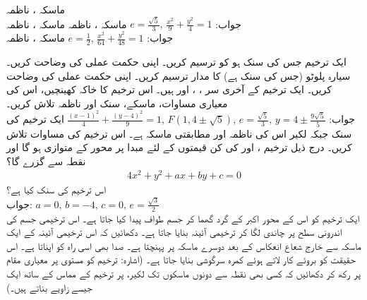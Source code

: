 ماسکہ ، ناظمہ \\
جواب:\quad
$e=\tfrac{\sqrt{5}}{3},\, \tfrac{x^2}{9}+\tfrac{y^2}{4}=1$
ماسکہ ، ناظمہ 
ماسکہ ، ناظمہ \\
جواب:\quad
$e=\tfrac{1}{2},\, \tfrac{x^2}{64}+\tfrac{y^2}{48}=1$
ماسکہ ، ناظمہ 

ایک ترخیم جس کی سنک  ہو کو ترسیم کریں۔ اپنی حکمت عملی کی وضاحت  کریں۔
سیارہ پلوٹو (جس کی سنک  ہے) کا مدار ترسیم کریں۔  اپنی حکمت عملی کی وضاحت  کریں۔
ایک ترخیم کے آخری سر ، ،  اور  ہیں۔ اس ترخیم کا خاکہ کھینچیں، اس کی معیاری مساوات، ماسکے، سنک اور ناظمہ تلاش کریں۔\\
جواب:\quad
$\tfrac{(x-1)^2}{4}+\tfrac{(y-4)^2}{9}=1,\, F(1,4\pm\sqrt{5}),\,e=\tfrac{\sqrt{5}}{3},\, y=4\pm\tfrac{9\sqrt{5}}{5}$
ایک ترخیم کی سنک   جبکہ لکیر  اس کی ناظمہ اور  مطابقتی ماسکہ ہے۔ اس ترخیم کی مساوات تلاش کریں۔
درج ذیل ترخیم ،  اور  کی کن قیمتوں کے لئے مبدا پر  محور کے متوازی ہو گا اور نقطہ  سے گزرے گا؟
\begin{align*}
4x^2+y^2+ax+by+c=0
\end{align*}
اس ترخیم کی سنک  کیا ہے؟\\
جواب:\quad
$a=0,\, b=-4,\, c=0,\, e=\tfrac{\sqrt{3}}{2}$
\\
 ایک ترخیم کو اس کے محور اکبر کے گرد گھما کر جسم طواف پیدا کیا جاتا ہے۔ اس ترخیمی جسم کی اندرونی سطح پر چاندی لگا کر ترخیمی آئینہ بنایا جاتا ہے۔ دکھائیں کہ اس ترخیمی آئینہ کے ایک ماسکہ سے خارج شعاع انعکاس کے بعد دوسرے ماسکہ پر پہنچتا ہے۔ صدا بھی اسی راہ کو اپناتا ہے۔ اس حقیقت کو بروئے کار لاتے ہوئے کمرہ سرگوشی بنایا جاتا ہے۔ (اشارہ: ترخیم کو  مستوی پر معیاری مقام پر رکھ کر دکھائیں کہ کسی بھی نقطہ  سے دونوں ماسکوں تک لکیر،  پر ترخیم کے مماس کے ساتھ ایک جیسے زاویے بناتے ہیں۔)

